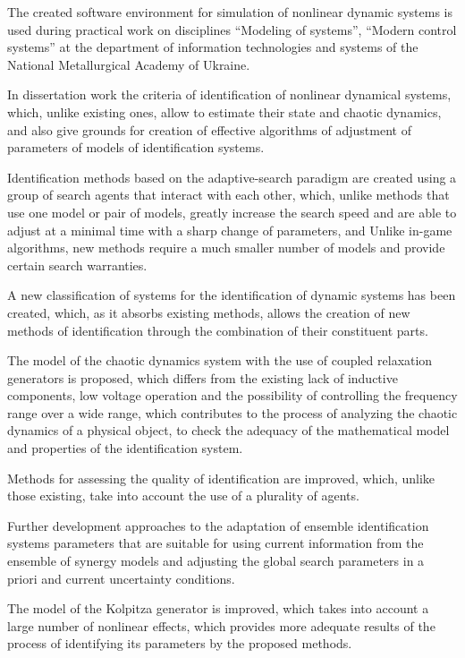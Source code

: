 The created software environment for simulation of nonlinear dynamic systems is
used during practical work on disciplines ``Modeling of systems'', ``Modern
control systems'' at the department of information technologies and systems of
the National Metallurgical Academy of Ukraine.

In dissertation work the criteria of identification of nonlinear dynamical
systems, which, unlike existing ones, allow to estimate their state and chaotic
dynamics, and also give grounds for creation of effective algorithms of
adjustment of parameters of models of identification systems.

Identification methods based on the adaptive-search paradigm are created using
a group of search agents that interact with each other, which, unlike methods
that use one model or pair of models, greatly increase the search speed and are
able to adjust at a minimal time with a sharp change of parameters, and Unlike
in-game algorithms, new methods require a much smaller number of models and
provide certain search warranties.

A new classification of systems for the identification of dynamic systems has
been created, which, as it absorbs existing methods, allows the creation of new
methods of identification through the combination of their constituent parts.

The model of the chaotic dynamics system with the use of coupled relaxation
generators is proposed, which differs from the existing lack of inductive
components, low voltage operation and the possibility of controlling the
frequency range over a wide range, which contributes to the process of
analyzing the chaotic dynamics of a physical object, to check the adequacy of
the mathematical model and properties of the identification system.

Methods for assessing the quality of identification are improved, which, unlike
those existing, take into account the use of a plurality of agents.

Further development approaches to the adaptation of ensemble identification
systems parameters that are suitable for using current information from the
ensemble of synergy models and adjusting the global search parameters in a
priori and current uncertainty conditions.

The model of the Kolpitza generator is improved, which takes into account a
large number of nonlinear effects, which provides more adequate results of the
process of identifying its parameters by the proposed methods.

